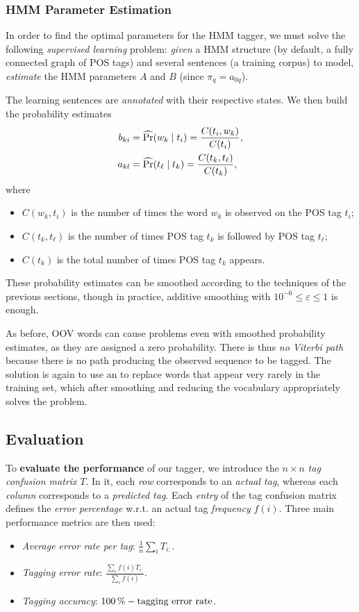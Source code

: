 \subsubsection{HMM Parameter Estimation}
In order to find the optimal parameters for the HMM tagger, we must solve the following \emph{supervised learning} problem: \emph{given} a HMM structure (by default, a fully connected graph of POS tags) and several sentences (a training corpus) to model, \emph{estimate} the HMM parameters \(A\) and \(B\) (since \(\pi_q = a_{0q}\)).

The learning sentences are \emph{annotated} with their respective states.
We then build the probability estimates
\begin{align*}
	b_{ki} &= \operatorname{\widehat{\Pr}}(w_k \mid t_i) = \frac{C(t_i, w_k)}{C(t_i)},\\
	a_{kl} &= \operatorname{\widehat{\Pr}}(t_\ell \mid t_k) = \frac{C(t_k, t_\ell)}{C(t_k)},
\end{align*}
where
\begin{itemize}
	\item \(C(w_k, t_i)\) is the number of times the word \(w_k\) is observed on the POS tag \(t_i\);
	\item \(C(t_k, t_\ell)\) is the number of times POS tag \(t_k\) is followed by POS tag \(t_\ell\);
	\item \(C(t_k)\) is the total number of times POS tag \(t_k\) appears.
\end{itemize}
These probability estimates can be smoothed according to the techniques of the previous sections, though in practice, additive smoothing with \(10^{-6} \leq \varepsilon \leq 1\) is enough.

As before, OOV words can cause problems even with smoothed probability estimates, as they are assigned a zero probability.
There is thus \emph{no Viterbi path} because there is no path producing the observed sequence to be tagged.
The solution is again to use an \unktoken{} to replace words that appear very rarely in the training set, which after smoothing and reducing the vocabulary appropriately solves the problem.

\subsection{Evaluation}
To \textbf{evaluate the performance} of our tagger, we introduce the \(n \times n\) \emph{tag confusion matrix} \(T\).
In it, each \emph{row} corresponds to an \emph{actual tag}, whereas each \emph{column} corresponds to a \emph{predicted tag}.
Each \emph{entry} of the tag confusion matrix defines the \emph{error percentage} w.r.t. an actual tag \emph{frequency} \(f(i)\).
Three main performance metrics are then used:
\begin{itemize}
	\item \emph{Average error rate per tag}: \(\displaystyle\frac{1}{n} \sum_{i} T_{i:}\).
	\item \emph{Tagging error rate}: \(\displaystyle\frac{\sum_{i} f(i) T_{i:}}{\sum_{i} f(i)}\).
	\item \emph{Tagging accuracy}: \(\SI{100}{\percent} - \textnormal{tagging error rate}\).
\end{itemize}

